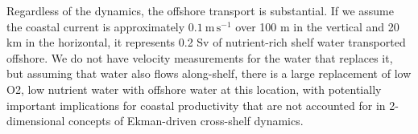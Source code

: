 \documentclass[draft]{agujournal2019}
\begin{document}
Regardless of the dynamics, the offshore transport is substantial.  If we assume the coastal current is approximately $0.1\ \mathrm{m\,s^{-1}}$ over 100 m in the vertical and 20 km in the horizontal, it represents 0.2 Sv of nutrient-rich shelf water transported offshore. We do not have velocity measurements for the water that replaces it, but assuming that water also flows along-shelf, there is a large replacement of low O2, low nutrient water with offshore water at this location, with potentially important implications for coastal productivity that are not accounted for in 2-dimensional concepts of Ekman-driven cross-shelf dynamics.

\clearpage
%

%
%

%

%




%
%
%
%
%
%
\end{document}
